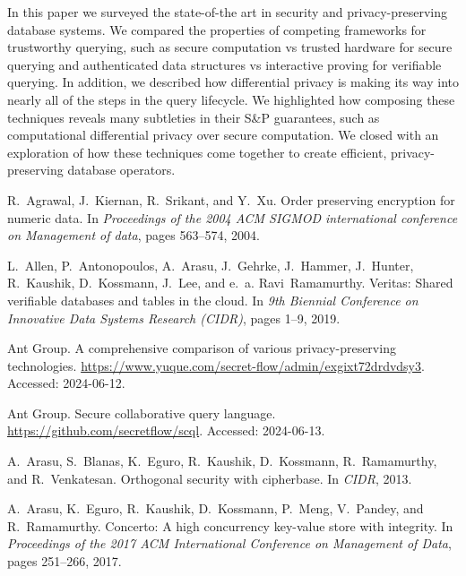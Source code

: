 \documentclass[11pt]{article}
\newcommand{\sandp}{S\&P\xspace}
\begin{document}
In this paper we surveyed the state-of-the art in security and privacy-preserving database systems.  We compared the properties of competing frameworks for trustworthy querying, such as secure computation vs trusted hardware for secure querying and authenticated data structures vs interactive proving for verifiable querying.  In addition, we described how differential privacy is making its way into nearly all of the steps in the query lifecycle.  We highlighted how composing these techniques reveals many subtleties in their \sandp guarantees, such as computational differential privacy over secure computation.  We closed with an exploration of how these techniques come together to create efficient, privacy-preserving database operators.

\begin{thebibliography}{140}
\itemsep=1pt
\begin{small}

R.~Agrawal, J.~Kiernan, R.~Srikant, and Y.~Xu.
\newblock Order preserving encryption for numeric data.
\newblock In {\em Proceedings of the 2004 ACM SIGMOD international conference
  on Management of data}, pages 563--574, 2004.

L.~Allen, P.~Antonopoulos, A.~Arasu, J.~Gehrke, J.~Hammer, J.~Hunter,
  R.~Kaushik, D.~Kossmann, J.~Lee, and e.~a. Ravi~Ramamurthy.
\newblock Veritas: Shared verifiable databases and tables in the cloud.
\newblock In {\em 9th Biennial Conference on Innovative Data Systems Research
  (CIDR)}, pages 1--9, 2019.

{Ant Group}.
\newblock A comprehensive comparison of various privacy-preserving
  technologies.
\newblock \url{https://www.yuque.com/secret-flow/admin/exgixt72drdvdsy3}.
\newblock Accessed: 2024-06-12.

{Ant Group}.
\newblock Secure collaborative query language.
\newblock \url{https://github.com/secretflow/scql}.
\newblock Accessed: 2024-06-13.

A.~Arasu, S.~Blanas, K.~Eguro, R.~Kaushik, D.~Kossmann, R.~Ramamurthy, and
  R.~Venkatesan.
\newblock Orthogonal security with cipherbase.
\newblock In {\em CIDR}, 2013.

A.~Arasu, K.~Eguro, R.~Kaushik, D.~Kossmann, P.~Meng, V.~Pandey, and
  R.~Ramamurthy.
\newblock Concerto: A high concurrency key-value store with integrity.
\newblock In {\em Proceedings of the 2017 ACM International Conference on
  Management of Data}, pages 251--266, 2017.


\end{small}
\end{thebibliography}
\end{document}

